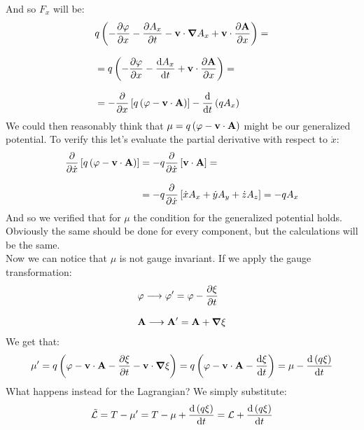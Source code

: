 And so $F_x$ will be:
\begin{equation}
  \begin{split}
    &q \brackets{-\pdv{\potE}{x} - \pdv{A_x}{t}  -\vec{v} \cdot \grad{A_x} + \vec{v}\cdot \pdv{\vec{A}}{x}} = \\[8pt]
    &= q \brackets{-\pdv{\potE}{x} - \dv{A_x}{t} + \vec{v}\cdot \pdv{\vec{A}}{x}} = \\[8pt]
    &= -\pdv{}{x}\left[q\brackets{\potE - \vec{v}\cdot \vec{A}}\right] - \dv{}{t}\brackets{qA_x}
  \end{split}
\end{equation}
We could then reasonably think that $\mu = q\left(\varphi - \vb{v}\cdot \vb{A}\right)$ might be our generalized potential. To verify this let's evaluate the partial derivative with respect to $\dot{x}$:
\begin{equation}
  \begin{split}
    \pdv{}{\dot{x}} \left[q\brackets{\potE - \vec{v}\cdot \vec{A}}\right] &= -q \pdv{}{\dot{x}} \left[\vec{v} \cdot \vec{A}\right] = \\[8pt]
    &= -q \pdv{}{\dot{x}} \left[\dot{x} A_x + \dot{y} A_y + \dot{z} A_z\right] = -q A_x
  \end{split}
\end{equation}
And so we verified that for $\mu$ the condition for the generalized potential holds. Obviously the same should be done for every component, but the calculations will be the same.\\
Now we can notice that $\mu$ is not gauge invariant. If we apply the gauge transformation:
\begin{equation}
  \begin{split}
    &\potE \longrightarrow \potE' = \potE - \pdv{\xi}{t} \\[8pt]
    &\vec{A} \longrightarrow \vec{A}' = \vec{A} + \grad{\xi}
  \end{split}
\end{equation}
We get that:
\begin{equation}
  \mu' = q\brackets{\potE  - \vec{v}\cdot \vec{A} - \pdv{\xi}{t} - \vec{v}\cdot \grad{\xi}} = q\brackets{\potE  - \vec{v}\cdot \vec{A} -\dv{\xi}{t}} = \mu -\dv{\brackets{q\xi}}{t}
\end{equation}
What happens instead for the Lagrangian? We simply substitute:
\begin{equation} \label{e:gauge_lagr}
  \tilde{\lagr} = T - \mu' = T -\mu +\dv{\brackets{q\xi}}{t} = \lagr  +\dv{\brackets{q\xi}}{t}
\end{equation}
